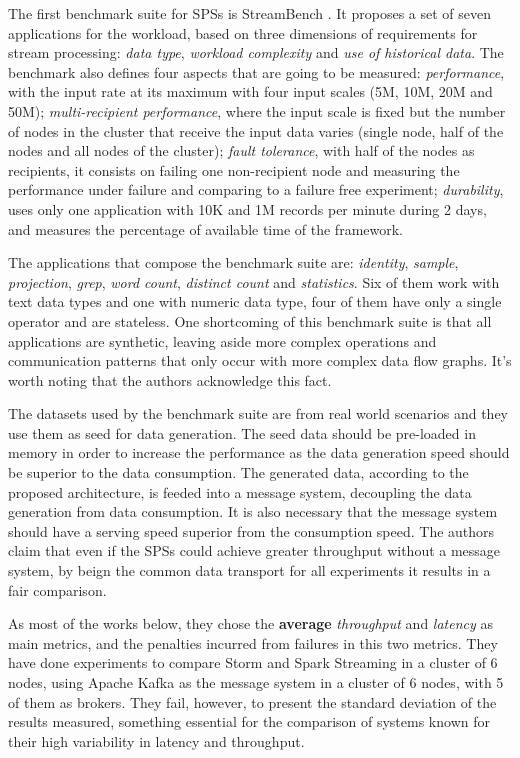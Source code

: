 \documentclass[ppgc,diss,english]{iiufrgs}
\begin{document}

The first benchmark suite for SPSs is StreamBench \cite{lu2014stream}. It proposes a set of seven applications for the workload, based on three dimensions of requirements for stream processing: \emph{data type}, \emph{workload complexity} and \emph{use of historical data}. The benchmark also defines four aspects that are going to be measured: \emph{performance}, with the input rate at its maximum with four input scales (5M, 10M, 20M and 50M); \emph{multi-recipient performance}, where the input scale is fixed but the number of nodes in the cluster that receive the input data varies (single node, half of the nodes and all nodes of the cluster); \emph{fault tolerance}, with half of the nodes as recipients, it consists on failing one non-recipient node and measuring the performance under failure and comparing to a failure free experiment; \emph{durability}, uses only one application with 10K and 1M records per minute during 2 days, and measures the percentage of available time of the framework.

The applications that compose the benchmark suite are: \emph{identity}, \emph{sample}, \emph{projection}, \emph{grep}, \emph{word count}, \emph{distinct count} and \emph{statistics}. Six of them work with text data types and one with numeric data type, four of them have only a single operator and are stateless. One shortcoming of this benchmark suite is that all applications are synthetic, leaving aside more complex operations and communication patterns that only occur with more complex data flow graphs. It's worth noting that the authors acknowledge this fact.

The datasets used by the benchmark suite are from real world scenarios and they use them as seed for data generation. The seed data should be pre-loaded in memory in order to increase the performance as the data generation speed should be superior to the data consumption. The generated data, according to the proposed architecture, is feeded into a message system, decoupling the data generation from data consumption. It is also necessary that the message system should have a serving speed superior from the consumption speed. The authors claim that even if the SPSs could achieve greater throughput without a message system, by beign the common data transport for all experiments it results in a fair comparison.

As most of the works below, they chose the \textbf{average} \emph{throughput} and \emph{latency} as main metrics, and the penalties incurred from failures in this two metrics. They have done experiments to compare Storm and Spark Streaming in a cluster of 6 nodes, using Apache Kafka as the message system in a cluster of 6 nodes, with 5 of them as brokers. They fail, however, to present the standard deviation of the results measured, something essential for the comparison of systems known for their high variability in latency and throughput.
\end{document}
